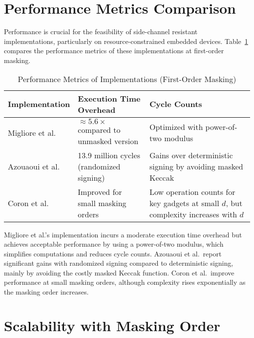 \section{Performance Metrics Comparison}

Performance is crucial for the feasibility of side-channel resistant implementations, particularly on resource-constrained embedded devices. Table~\ref{tab:performance_metrics} compares the performance metrics of these implementations at first-order masking.

\begin{table}[h]
    \centering
    \caption{Performance Metrics of Implementations (First-Order Masking)}
    \begin{tabular}{l p{4.5cm} p{5.5cm}}
        \toprule
        \textbf{Implementation}            & \textbf{Execution Time Overhead}                 & \textbf{Cycle Counts}                                                                \\
        \midrule
        Migliore et al.\ \cite{Migliore19} & $\approx 5.6\times$ compared to unmasked version & Optimized with power-of-two modulus                                                  \\
        Azouaoui et al.\ \cite{Azouaoui22} & 13.9 million cycles (randomized signing)         & Gains over deterministic signing by avoiding masked Keccak                           \\
        Coron et al.\ \cite{Coron23}       & Improved for small masking orders                & Low operation counts for key gadgets at small $d$, but complexity increases with $d$ \\
        \bottomrule
    \end{tabular}
    \label{tab:performance_metrics}
\end{table}

Migliore et al.'s implementation incurs a moderate execution time overhead but achieves acceptable performance by using a power-of-two modulus, which simplifies computations and reduces cycle counts. Azouaoui et al.\ report significant gains with randomized signing compared to deterministic signing, mainly by avoiding the costly masked Keccak function. Coron et al.\ improve performance at small masking orders, although complexity rises exponentially as the masking order increases.

\section{Scalability with Masking Order}

